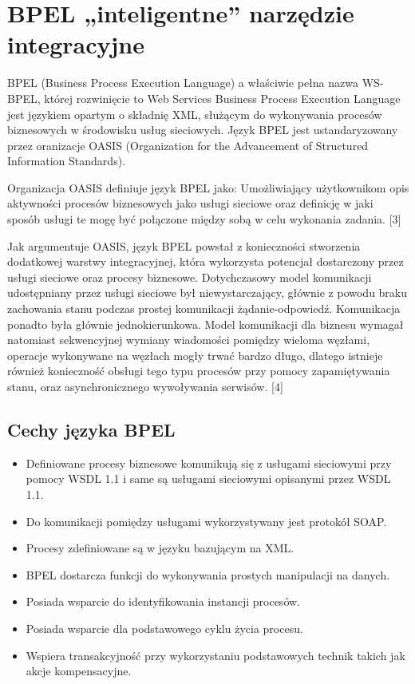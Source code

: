 \chapter{BPEL „inteligentne” narzędzie integracyjne}
\label{cha:bpel}

BPEL (Business Process Execution Language) a właściwie pełna nazwa WS-BPEL,  której rozwinięcie to Web Services Business Process Execution Language jest językiem opartym o składnię XML, służącym do wykonywania procesów biznesowych w środowisku  usług sieciowych. Język BPEL jest ustandaryzowany przez oranizacje OASIS (Organization for the Advancement of Structured Information Standards). 

Organizacja OASIS definiuje język BPEL jako: Umożliwiający użytkownikom opis aktywności procesów biznesowych jako usługi sieciowe oraz definicję w jaki sposób usługi te mogę być połączone między sobą w celu wykonania zadania. [3]

Jak argumentuje OASIS, język BPEL powstał z konieczności stworzenia dodatkowej warstwy integracyjnej, która wykorzysta potencjał dostarczony przez usługi sieciowe oraz procesy biznesowe. Dotychczasowy model komunikacji udostępniany przez usługi sieciowe był niewystarczający, głównie z powodu braku zachowania stanu podczas prostej komunikacji żądanie-odpowiedź.  Komunikacja ponadto była głównie jednokierunkowa. Model komunikacji dla biznesu wymagał natomiast sekwencyjnej wymiany wiadomości pomiędzy wieloma węzłami, operacje wykonywane na węzłach mogły trwać bardzo długo, dlatego istnieje również konieczność obsługi tego typu procesów przy pomocy zapamiętywania stanu, oraz asynchronicznego wywoływania serwisów. [4]





\section{Cechy języka BPEL}
\label{sec:bpelFeatures}

\begin{itemize}
\item Definiowane procesy biznesowe komunikują się z usługami sieciowymi przy pomocy WSDL 1.1 i same są usługami sieciowymi opisanymi przez WSDL 1.1.  
\item Do komunikacji pomiędzy usługami wykorzystywany jest protokół SOAP.
\item Procesy zdefiniowane są w języku bazującym na XML.
\item BPEL dostarcza funkcji do wykonywania prostych manipulacji na danych.
\item Posiada wsparcie do identyfikowania instancji procesów.
\item Posiada wsparcie dla podstawowego cyklu życia procesu.
\item Wspiera transakcyjność przy wykorzystaniu podstawowych technik takich jak akcje kompensacyjne.
\end{itemize}

